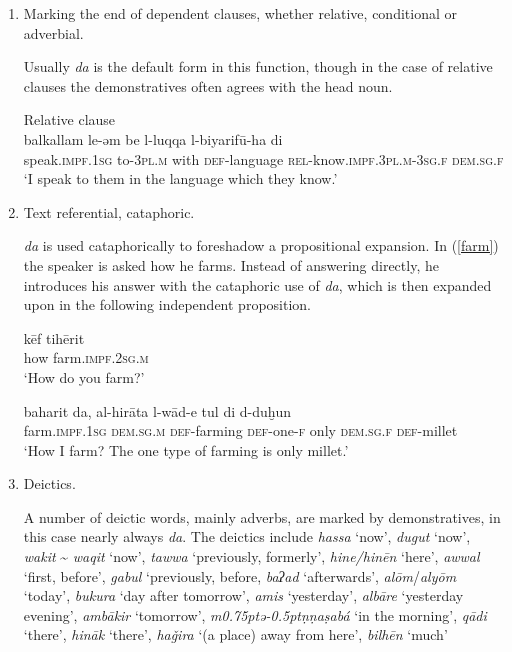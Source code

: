 \documentclass[output=paper]{langsci/langscibook}
\begin{document}
\begin{enumerate}[leftmargin=*]

\item Marking the end of dependent clauses, whether relative, conditional or adverbial.

Usually \textit{da} is the default form in this function, though in the case of relative clauses the demonstratives often agrees with the head noun.

\ea\label{luqqa} 
{}{}{\label{bkm:Ref520916704}Relative clause}\\
\gll balkallam le-əm be l-luqqa l-biyarifū-ha di\\
     speak.\textsc{impf.1sg} to-\textsc{3pl.m} with \textsc{def}-language \textsc{rel-}know.\textsc{impf.3pl.m-3sg.f} \textsc{dem.sg.f}\\
\glt ‘I speak to them in the language which they know.’
\z

\item Text referential, cataphoric. 

\textit{da} is used cataphorically to foreshadow a propositional expansion. In (\ref{farm}) the speaker is asked how he farms. Instead of answering directly, he introduces his answer with the cataphoric use of \textit{da}, which is then expanded upon in the following independent proposition.

\ea\label{farm}
\ea
\gll kēf tihērit\\
     how farm.\textsc{impf.2sg.m}\\
\glt ‘How do you farm?’

\ex 
\gll baharit da, al-hirāta l-wād-e tul di d-duḫun\\
     farm.\textsc{impf.1sg} \textsc{dem.sg.m} \textsc{def-}farming \textsc{def-}one-\textsc{f} only \textsc{dem.sg.f} \textsc{def-}millet\\
\glt ‘How I farm? The one type of farming is only millet.’\label{tul}
\z
\z

\item Deictics. 

A number of deictic words, mainly adverbs, are marked by demonstratives, in this case nearly always \textit{da}. The deictics include \textit{hassa} ‘now’, \textit{dugut} ‘now’, \textit{wakit} {\textasciitilde}  \textit{waqit} ‘now’, \textit{tawwa} ‘previously, formerly’, \textit{hine/hinēn} ‘here’, \textit{awwal} ‘first, before’, \textit{gabul} ‘previously, before, \textit{baʔad} ‘afterwards’, \textit{alōm}/\textit{alyōm} ‘today’, \textit{bukura} ‘day after tomorrow’, \textit{amis} ‘yesterday’, \textit{albāre} ‘yesterday evening’, \textit{ambākir} ‘tomorrow’, \textit{m\kern 0.75ptǝ\kern -0.5ptṇṇaṣabá} ‘in the morning’, \textit{qādi} ‘there’, \textit{hināk} ‘there’, \textit{haǧira} ‘(a place) away from here’, \textit{bilhēn} ‘much’


\end{enumerate}
\end{document}
